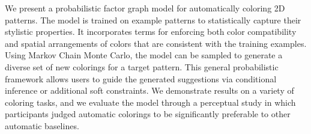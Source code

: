 We present a probabilistic factor graph model for automatically coloring 2D patterns. The model is trained on example patterns to statistically capture their stylistic properties. It incorporates terms for enforcing both color compatibility and spatial arrangements of colors that are consistent with the training examples. Using Markov Chain Monte Carlo, the model can be sampled to generate a diverse set of new colorings for a target pattern. This general probabilistic framework allows users to guide the generated suggestions via conditional inference or additional soft constraints. We demonstrate results on a variety of coloring tasks, and we evaluate the model through a perceptual study in which participants judged automatic colorings to be significantly preferable to other automatic baselines.